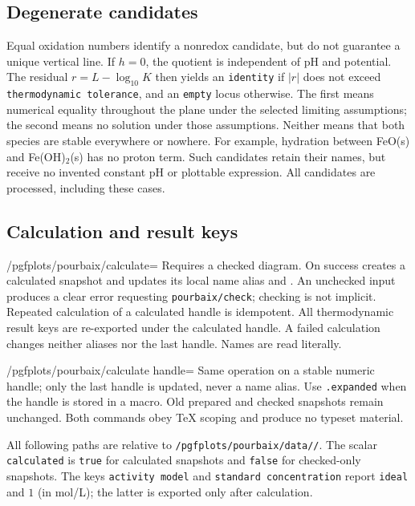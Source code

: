 \documentclass[a4paper,11pt]{ltxdoc}
\begin{document}
\subsection{Degenerate candidates}
Equal oxidation numbers identify a nonredox candidate, but do not guarantee a
unique vertical line. If $h=0$, the quotient is independent of pH and potential.
The residual $r=L-\log_{10}K$ then yields an \texttt{identity} if
$|r|$ does not exceed \texttt{thermodynamic tolerance}, and an \texttt{empty}
locus otherwise. The first means numerical equality throughout the plane under
the selected limiting assumptions; the second means no solution under those
assumptions. Neither means that both species are stable everywhere or nowhere.
For example, hydration between FeO(s) and Fe(OH)$_2$(s) has no proton term.
Such candidates retain their names, but receive no invented constant pH or
plottable expression. All candidates are processed, including these cases.

\subsection{Calculation and result keys}
\begin{key}{/pgfplots/pourbaix/calculate=}
Requires a checked diagram. On success creates a calculated snapshot and updates
its local name alias and . An unchecked input produces a
clear error requesting \texttt{pourbaix/check}; checking is not implicit.
Repeated calculation of a calculated handle is idempotent. All thermodynamic
result keys are re-exported under the calculated handle. A failed calculation
changes neither aliases nor the last handle. Names are read literally.
\end{key}
\begin{key}{/pgfplots/pourbaix/calculate handle=}
Same operation on a stable numeric handle; only the last handle is updated,
never a name alias. Use \texttt{.expanded} when the handle is stored in a macro.
Old prepared and checked snapshots remain unchanged. Both commands obey TeX
scoping and produce no typeset material.
\end{key}

All following paths are relative to
\texttt{/pgfplots/pourbaix/data/}\texttt{/}.
The scalar \texttt{calculated} is \texttt{true} for calculated snapshots and
\texttt{false} for checked-only snapshots. The keys \texttt{activity model} and
\texttt{standard concentration} report \texttt{ideal} and $1$ (in mol/L);
the latter is exported only after calculation.
\end{document}
